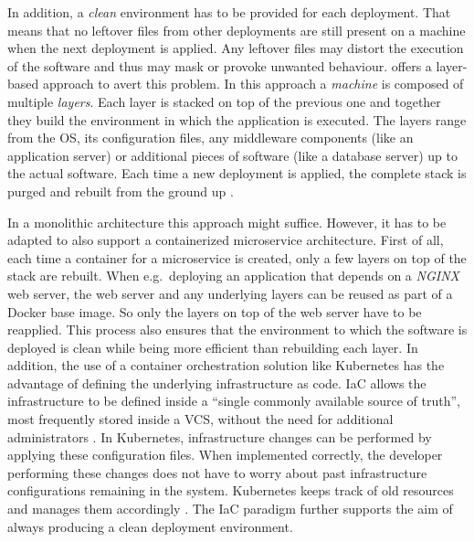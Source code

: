 In addition, a \textit{clean} environment has to be provided for each
deployment. That means that no leftover files from other deployments are still
present on a machine when the next deployment is applied. Any leftover files
may distort the execution of the software and thus may mask or provoke unwanted
behaviour. \autocite{ArtacDevOpsIntroducingInfrastructure2017} offers a
layer-based approach to avert this problem. In this approach a \textit{machine}
is composed of multiple \textit{layers}. Each layer is stacked on top of the
previous one and together they build the environment in which the application
is executed. The layers range from the \ac{OS}, its configuration files, any
middleware components (like an application server) or additional pieces of
software (like a database server) up to the actual software. Each time a new
deployment is applied, the complete stack is purged and rebuilt from the ground
up \autocite[p. 194]{MatyasContinuousIntegration2007}.

In a monolithic architecture this approach might suffice. However, it has to be
adapted to also support a containerized microservice architecture. First of
all, each time a container for a microservice is created, only a few layers on
top of the stack are rebuilt. When e.g.\ deploying an application that depends
on a \textit{NGINX} web server, the web server and any underlying layers can be
reused as part of a Docker base image. So only the layers on top of the web
server have to be reapplied. This process also ensures that the environment to
which the software is deployed is clean while being more efficient than
rebuilding each layer. In addition, the use of a container orchestration
solution like Kubernetes has the advantage of defining the underlying
infrastructure as code. \ac{IaC} allows the infrastructure to be defined inside
a \enquote{single commonly available source of truth}, most frequently stored
inside a \ac{VCS}, without the need for additional administrators
\autocite{ArtacDevOpsIntroducingInfrastructure2017}. In Kubernetes,
infrastructure changes can be performed by applying these configuration files.
When implemented correctly, the developer performing these changes does not have
to worry about past infrastructure configurations remaining in the system.
Kubernetes keeps track of old resources and manages them accordingly
\autocite{AuthorsDeployments2019}. The \ac{IaC} paradigm further supports the
aim of always producing a clean deployment environment.

